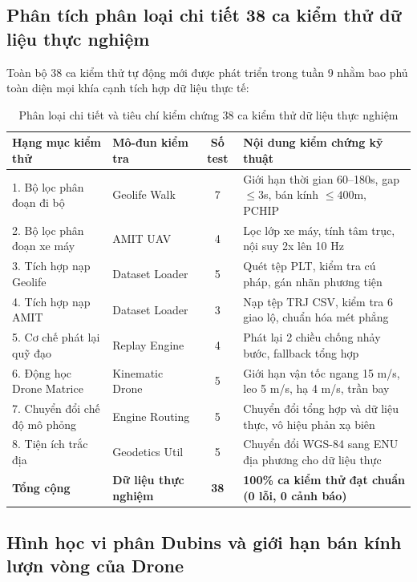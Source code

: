 \subsection{Phân tích phân loại chi tiết 38 ca kiểm thử dữ liệu thực nghiệm}

\hspace{0.5cm} Toàn bộ 38 ca kiểm thử tự động mới được phát triển trong tuần 9 nhằm bao phủ toàn diện mọi khía cạnh tích hợp dữ liệu thực tế:

\begin{table}[H]
\centering
\caption{Phân loại chi tiết và tiêu chí kiểm chứng 38 ca kiểm thử dữ liệu thực nghiệm}
\label{tab:38-real-data-tests-breakdown}
\begin{tabularx}{\linewidth}{llc>{\RaggedRight}X}
\toprule
\textbf{Hạng mục kiểm thử} & \textbf{Mô-đun kiểm tra} & \textbf{Số test} & \textbf{Nội dung kiểm chứng kỹ thuật} \\
\midrule
1. Bộ lọc phân đoạn đi bộ & Geolife Walk & 7 & Giới hạn thời gian 60--180s, gap $\le 3$s, bán kính $\le 400$m, PCHIP \\
2. Bộ lọc phân đoạn xe máy & AMIT UAV & 4 & Lọc lớp xe máy, tính tâm trục, nội suy 2x lên 10 Hz \\
3. Tích hợp nạp Geolife & Dataset Loader & 5 & Quét tệp PLT, kiểm tra cú pháp, gán nhãn phương tiện \\
4. Tích hợp nạp AMIT & Dataset Loader & 3 & Nạp tệp TRJ CSV, kiểm tra 6 giao lộ, chuẩn hóa mét phẳng \\
5. Cơ chế phát lại quỹ đạo & Replay Engine & 4 & Phát lại 2 chiều chống nhảy bước, fallback tổng hợp \\
6. Động học Drone Matrice & Kinematic Drone & 5 & Giới hạn vận tốc ngang 15 m/s, leo 5 m/s, hạ 4 m/s, trần bay \\
7. Chuyển đổi chế độ mô phỏng & Engine Routing & 5 & Chuyển đổi tổng hợp và dữ liệu thực, vô hiệu phản xạ biên \\
8. Tiện ích trắc địa & Geodetics Util & 5 & Chuyển đổi WGS-84 sang ENU địa phương cho dữ liệu thực \\
\midrule
\textbf{Tổng cộng} & \textbf{Dữ liệu thực nghiệm} & \textbf{38} & \textbf{100\% ca kiểm thử đạt chuẩn (0 lỗi, 0 cảnh báo)} \\
\bottomrule
\end{tabularx}
\end{table}

\subsection{Hình học vi phân Dubins và giới hạn bán kính lượn vòng của Drone}

